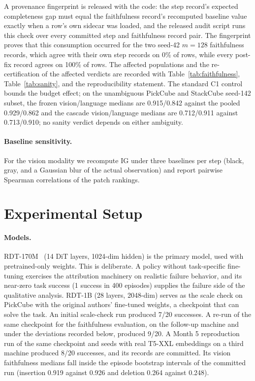 \documentclass{article}
\begin{document}
A provenance fingerprint is released with the code: the step record's expected completeness gap must equal the faithfulness record's recomputed baseline value exactly when a row's own sidecar was loaded, and the released audit script runs this check over every committed step and faithfulness record pair.
The fingerprint proves that this consumption occurred for the two seed-42 $m{=}128$ faithfulness records, which agree with their own step records on 0\% of rows, while every post-fix record agrees on 100\% of rows.
The affected populations and the re-certification of the affected verdicts are recorded with Table~\ref{tab:faithfulness}, Table~\ref{tab:sanity}, and the reproducibility statement.
The standard C1 control bounds the budget effect; on the unambiguous PickCube and StackCube seed-142 subset, the frozen vision/language medians are 0.915/0.842 against the pooled 0.929/0.862 and the cascade vision/language medians are 0.712/0.911 against 0.713/0.910; no sanity verdict depends on either ambiguity.

\paragraph{Baseline sensitivity.}
For the vision modality we recompute IG under three baselines per step (black, gray, and a Gaussian blur of the actual observation) and report pairwise Spearman correlations of the patch rankings.

\section{Experimental Setup}
\label{sec:setup}

\paragraph{Models.}
RDT-170M~\cite{liu2024rdt} (14 DiT layers, 1024-dim hidden) is the primary model, used with pretrained-only weights.
This is deliberate.
A policy without task-specific fine-tuning exercises the attribution machinery on realistic failure behavior, and its near-zero task success (1 success in 400 episodes) supplies the failure side of the qualitative analysis.
RDT-1B (28 layers, 2048-dim) serves as the scale check on PickCube with the original authors' fine-tuned weights, a checkpoint that can solve the task.
An initial scale-check run produced 7/20 successes.
A re-run of the same checkpoint for the faithfulness evaluation, on the follow-up machine and under the deviations recorded below, produced 9/20.
A Month 5 reproduction run of the same checkpoint and seeds with real T5-XXL embeddings on a third machine produced 8/20 successes, and its records are committed.
Its vision faithfulness medians fall inside the episode bootstrap intervals of the committed run (insertion 0.919 against 0.926 and deletion 0.264 against 0.248).
\end{document}
